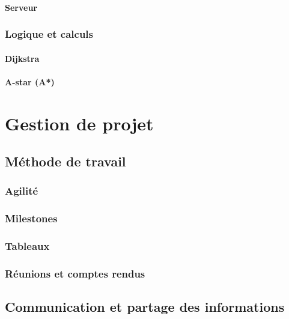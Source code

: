 \documentclass{article}
\begin{document}
    \paragraph{Serveur}

    \subsubsection{Logique et calculs}

    \paragraph{Dijkstra}

    \paragraph{A-star (A*)}

    \newpage


    \section{Gestion de projet}

    \subsection{Méthode de travail}

    \subsubsection{Agilité}

    \subsubsection{Milestones}

    \subsubsection{Tableaux}

    \subsubsection{Réunions et comptes rendus}

    \subsection{Communication et partage des informations}
\end{document}
